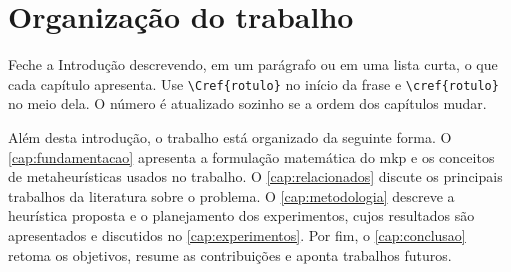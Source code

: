 \section{Organização do trabalho}
\label{sec:introducao:organizacao}

\begin{instrucao}
Feche a Introdução descrevendo, em um parágrafo ou em uma lista curta, o que
cada capítulo apresenta. Use \verb|\Cref{rotulo}| no início da frase e
\verb|\cref{rotulo}| no meio dela. O número é atualizado sozinho se a ordem dos
capítulos mudar.
\end{instrucao}

Além desta introdução, o trabalho está organizado da seguinte forma. O
\cref{cap:fundamentacao} apresenta a formulação matemática do \acs{mkp} e os
conceitos de metaheurísticas usados no trabalho. O \cref{cap:relacionados}
discute os principais trabalhos da literatura sobre o problema. O
\cref{cap:metodologia} descreve a heurística proposta e o planejamento dos
experimentos, cujos resultados são apresentados e discutidos no
\cref{cap:experimentos}. Por fim, o \cref{cap:conclusao} retoma os objetivos,
resume as contribuições e aponta trabalhos futuros.
